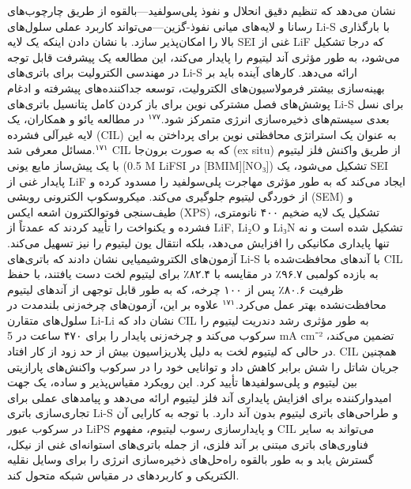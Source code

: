 \documentclass[12pt,a4paper,twocolumn]{article} %
\newcommand{\persian}[1]{\textfarsi{#1}}
\newcommand{\english}[1]{\textenglish{#1}}
\begin{document}
\persian{
نشان می‌دهد که تنظیم دقیق انحلال و نفوذ پلی‌سولفید—بالقوه از طریق چارچوب‌های رسانا و لایه‌های میانی نفوذ-گزین—می‌تواند کاربرد عملی سلول‌های \english{Li-S} با بارگذاری بالا را امکان‌پذیر سازد. با نشان دادن اینکه یک لایه \english{SEI} غنی از \english{LiF} که درجا تشکیل می‌شود، به طور مؤثری آند لیتیوم را پایدار می‌کند، این مطالعه یک پیشرفت قابل توجه در مهندسی الکترولیت برای باتری‌های \english{Li-S} ارائه می‌دهد. کارهای آینده باید بر بهینه‌سازی بیشتر فرمولاسیون‌های الکترولیت، توسعه جداکننده‌های پیشرفته و ادغام پوشش‌های فصل مشترکی نوین برای باز کردن کامل پتانسیل باتری‌های \english{Li-S} برای نسل بعدی سیستم‌های ذخیره‌سازی انرژی متمرکز شود.$^{۱۷۷}$
}
\persian{
در مطالعه یائو و همکاران، یک لایه غیرآلی فشرده (\english{CIL}) به عنوان یک استراتژی محافظتی نوین برای پرداختن به این مسائل معرفی شد.$^{۱۷۱}$ \english{CIL} که به صورت برون‌جا (\english{ex situ}) از طریق واکنش فلز لیتیوم با یک پیش‌ساز مایع یونی (\english{0.5 M LiFSI} در \english{[BMIM][NO₃]}) تشکیل می‌شود، یک \english{SEI} پایدار غنی از \english{LiF} ایجاد می‌کند که به طور مؤثری مهاجرت پلی‌سولفید را مسدود کرده و از خوردگی لیتیوم جلوگیری می‌کند. میکروسکوپ الکترونی روبشی (\english{SEM}) و طیف‌سنجی فوتوالکترون اشعه ایکس (\english{XPS}) تشکیل یک لایه ضخیم ۴۰۰ نانومتری، فشرده و یکنواخت را تأیید کردند که عمدتاً از \english{LiF}, \english{Li₂O} و \english{Li₃N} تشکیل شده است و نه تنها پایداری مکانیکی را افزایش می‌دهد، بلکه انتقال یون لیتیوم را نیز تسهیل می‌کند. آزمون‌های الکتروشیمیایی نشان دادند که باتری‌های \english{Li-S} با آندهای محافظت‌شده با \english{CIL} به بازده کولمبی ۹۶.۷٪ در مقایسه با ۸۲.۴٪ برای لیتیوم لخت دست یافتند، با حفظ ظرفیت ۸۰.۶٪ پس از ۱۰۰ چرخه، که به طور قابل توجهی از آندهای لیتیوم محافظت‌نشده بهتر عمل می‌کرد.$^{۱۷۱}$ علاوه بر این، آزمون‌های چرخه‌زنی بلندمدت در سلول‌های متقارن \english{Li-Li} نشان داد که \english{CIL} به طور مؤثری رشد دندریت لیتیوم را سرکوب می‌کند و چرخه‌زنی پایدار را برای ۴۷۰ ساعت در \english{5 mA cm⁻²} تضمین می‌کند، در حالی که لیتیوم لخت به دلیل پلاریزاسیون بیش از حد زود از کار افتاد. \english{CIL} همچنین جریان شاتل را شش برابر کاهش داد و توانایی خود را در سرکوب واکنش‌های پارازیتی بین لیتیوم و پلی‌سولفیدها تأیید کرد. این رویکرد مقیاس‌پذیر و ساده، یک جهت امیدوارکننده برای افزایش پایداری آند فلز لیتیوم ارائه می‌دهد و پیامدهای عملی برای تجاری‌سازی باتری \english{Li-S} و طراحی‌های باتری لیتیوم بدون آند دارد. با توجه به کارایی آن در سرکوب عبور \english{LiPS} و پایدارسازی رسوب لیتیوم، مفهوم \english{CIL} می‌تواند به سایر فناوری‌های باتری مبتنی بر آند فلزی، از جمله باتری‌های استوانه‌ای غنی از نیکل، گسترش یابد و به طور بالقوه راه‌حل‌های ذخیره‌سازی انرژی را برای وسایل نقلیه الکتریکی و کاربردهای در مقیاس شبکه متحول کند.
}
\end{document}
